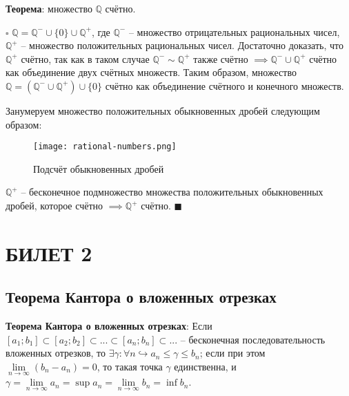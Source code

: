 \documentclass[12pt, a4paper, reqno]{article}
\begin{document}
    \textbf{Теорема}: множество $\mathbb{Q}$ счётно.

    $\square$ $\mathbb{Q} = \mathbb{Q}^{-}\cup\{0\}\cup\mathbb{Q}^{+}$, где $\mathbb{Q}^{-}$ --
    множество отрицательных рациональных чисел, $\mathbb{Q}^{+}$ -- множество положительных
    рациональных чисел. Достаточно доказать, что $\mathbb{Q}^{+}$ счётно, так как в таком случае
    $\mathbb{Q}^{-} \sim \mathbb{Q}^{+}$ также счётно $\implies \mathbb{Q}^{-}\cup\mathbb{Q}^{+}$
    счётно как объединение двух счётных множеств. Таким образом, множество
    $\mathbb{Q} = (\mathbb{Q}^{-}\cup\mathbb{Q}^{+})\cup\{0\}$ счётно как объединение счётного и
    конечного множеств.

    Занумеруем множество положительных обыкновенных дробей следующим образом:\\
    \begin{figure}[H]
        \centering
        \texttt{[image: rational-numbers.png]}
        \caption{Подсчёт обыкновенных дробей}
    \end{figure}

    $\mathbb{Q}^{+}$ -- бесконечное подмножество множества положительных обыкновенных дробей, которое
    счётно $\implies \mathbb{Q}^{+}$ счётно. $\blacksquare$

\newpage
\section{БИЛЕТ 2}

\subsection{Теорема Кантора о вложенных отрезках}

    \textbf{Теорема Кантора о вложенных отрезках}: Если $[a_1; b_1] \subset [a_2; b_2] \subset ...
    \subset [a_n; b_n] \subset ...$ -- бесконечная последовательность вложенных отрезков, то
    $\exists\gamma: \forall n \hookrightarrow a_n \leq \gamma \leq b_n$; если при этом
    $\lim\limits_{n\to \infty} (b_n - a_n) = 0$, то такая точка $\gamma$ единственна, и
    $\gamma = \lim\limits_{n\to\infty}a_n = \sup a_n = \lim\limits_{n\to\infty}b_n = \inf b_n$.
\end{document}
